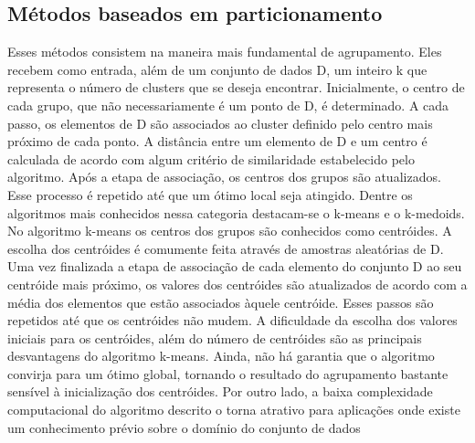 \subsection{Métodos baseados em particionamento}
Esses métodos consistem na maneira mais fundamental de agrupamento. Eles recebem
como entrada, além de um conjunto de dados D, um inteiro k que representa o
número de clusters que se deseja encontrar. Inicialmente, o centro de cada grupo, que
não necessariamente é um ponto de D, é determinado. A cada passo, os elementos de D
são associados ao cluster definido pelo centro mais próximo de cada ponto. A distância
entre um elemento de D e um centro é calculada de acordo com algum critério de similaridade
estabelecido pelo algoritmo. Após a etapa de associação, os centros dos grupos
são atualizados. Esse processo é repetido até que um ótimo local seja atingido. Dentre os
algoritmos mais conhecidos nessa categoria destacam-se o k-means e o k-medoids.
No algoritmo k-means os centros dos grupos são conhecidos como centróides. A escolha
dos centróides é comumente feita através de amostras aleatórias de D. Uma vez finalizada
a etapa de associação de cada elemento do conjunto D ao seu centróide mais próximo, os
valores dos centróides são atualizados de acordo com a média dos elementos que estão
associados àquele centróide. Esses passos são repetidos até que os centróides não mudem.
A dificuldade da escolha dos valores iniciais para os centróides, além do número de centróides
são as principais desvantagens do algoritmo k-means. Ainda, não há garantia que
o algoritmo convirja para um ótimo global, tornando o resultado do agrupamento bastante
sensível à inicialização dos centróides. Por outro lado, a baixa complexidade computacional
do algoritmo descrito o torna atrativo para aplicações onde existe um conhecimento
prévio sobre o domínio do conjunto de dados

